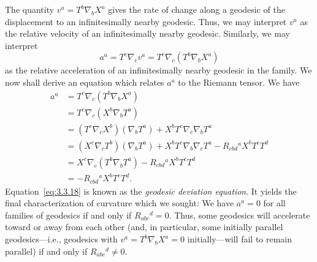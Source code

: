 The quantity $v^a=T^b\nabla_bX^a$ gives the rate of change along a geodesic of the
displacement to an infinitesimally nearby geodesic. Thus, we may interpret $v^a$ as the
relative velocity of an infinitesimally nearby geodesic. Similarly, we may interpret
\begin{equation}
  a^a=T^c\nabla_cv^a=T^c\nabla_c(T^b\nabla_bX^a)
  \tag{3.3.17}\label{eq:3.3.17}
\end{equation}
as the relative acceleration of an infinitesimally nearby geodesic in the family. We
now shall derive an equation which relates $a^a$ to the Riemann tensor. We have
\begin{equation}
  \begin{aligned}
    a^a
    &=T^c\nabla_c(T^b\nabla_bX^a)\\
    &=T^c\nabla_c(X^b\nabla_bT^a)\\
    &=(T^c\nabla_cX^b)(\nabla_bT^a)+X^bT^c\nabla_c\nabla_bT^a\\
    &=(X^c\nabla_cT^b)(\nabla_bT^a)+X^bT^c\nabla_b\nabla_cT^a
      -R_{cbd}{}^aX^bT^cT^d\\
    &=X^c\nabla_c(T^b\nabla_bT^a)-R_{cbd}{}^aX^bT^cT^d\\
    &=-R_{cbd}{}^aX^bT^cT^d.
  \end{aligned}
  \tag{3.3.18}\label{eq:3.3.18}
\end{equation}
Equation~\eqref{eq:3.3.18} is known as the \emph{geodesic deviation equation}. It yields the final
characterization of curvature which we sought: We have $a^a=0$ for all families of
geodesics if and only if $R_{abc}{}^d=0$. Thus, some geodesics will accelerate toward or
away from each other (and, in particular, some initially parallel geodesics---i.e.,
geodesics with $v^a=T^b\nabla_bX^a=0$ initially---will fail to remain parallel) if and only
if $R_{abc}{}^d\ne0$.
